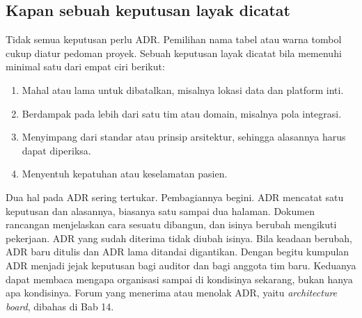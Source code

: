 \subsection*{Kapan sebuah keputusan layak dicatat}

Tidak semua keputusan perlu ADR. Pemilihan nama tabel atau warna tombol cukup
diatur pedoman proyek. Sebuah keputusan layak dicatat bila memenuhi minimal
satu dari empat ciri berikut:

\begin{enumerate}
  \item Mahal atau lama untuk dibatalkan, misalnya lokasi data dan platform
        inti.
  \item Berdampak pada lebih dari satu tim atau domain, misalnya pola
        integrasi.
  \item Menyimpang dari standar atau prinsip arsitektur, sehingga alasannya
        harus dapat diperiksa.
  \item Menyentuh kepatuhan atau keselamatan pasien.
\end{enumerate}

Dua hal pada ADR sering tertukar. Pembagiannya begini. ADR mencatat satu
keputusan dan alasannya, biasanya satu sampai dua halaman. Dokumen rancangan
menjelaskan cara sesuatu dibangun, dan isinya berubah mengikuti pekerjaan.
ADR yang sudah diterima tidak diubah isinya. Bila keadaan berubah, ADR baru
ditulis dan ADR lama ditandai digantikan. Dengan begitu kumpulan ADR menjadi
jejak keputusan bagi auditor dan bagi anggota tim baru. Keduanya dapat
membaca mengapa organisasi sampai di kondisinya sekarang, bukan hanya apa
kondisinya. Forum yang menerima atau menolak ADR, yaitu \textit{architecture
board}, dibahas di Bab 14.

